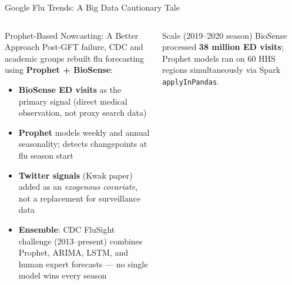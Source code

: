 \documentclass[aspectratio=169,10pt]{beamer}
\begin{document}
\begin{frame}{Google Flu Trends: A Big Data Cautionary Tale}
\begin{columns}[T]
      \begin{block}{Prophet-Based Nowcasting: A Better Approach}
        Post-GFT failure, CDC and academic groups rebuilt
        flu forecasting using \textbf{Prophet + BioSense}:
        \begin{itemize}
          \item \textbf{BioSense ED visits} as the primary signal
                (direct medical observation, not proxy search data)
          \item \textbf{Prophet} models weekly and annual seasonality;
                detects changepoints at flu season start
          \item \textbf{Twitter signals} (Kwak paper) added as
                an \emph{exogenous covariate}, not a replacement
                for surveillance data
          \item \textbf{Ensemble}: CDC FluSight challenge (2013--present)
                combines Prophet, ARIMA, LSTM, and human
                expert forecasts — no single model wins every season
        \end{itemize}
      \end{block}
      \vspace{4pt}
      \begin{exampleblock}{Scale (2019--2020 season)}
        BioSense processed \textbf{38 million ED visits};
        Prophet models ran on 60 HHS regions simultaneously
        via Spark \texttt{applyInPandas}.
      \end{exampleblock}
  \end{columns}
\end{frame}
\end{document}
